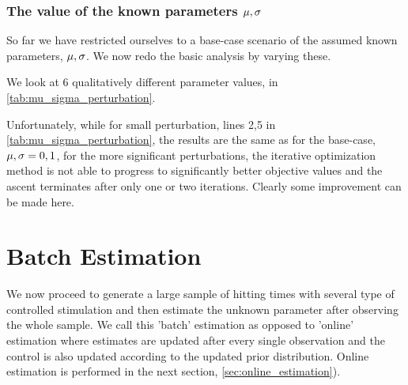 \subsubsection{The value of the known parameters $\mu, \sigma$}
So far we have restricted ourselves to a base-case scenario of the assumed known
parameters, $\mu, \sigma$. We now redo the basic analysis by varying these.

We look at 6 qualitatively different parameter values, in
\cref{tab:mu_sigma_perturbation}.

Unfortunately, while for small perturbation, lines 2,5 in
\cref{tab:mu_sigma_perturbation}, the results are the same as for the base-case,
${\mu },\sigma = 0,1$, for the more significant perturbations, the iterative
 optimization method is not able to progress to significantly better objective
 values and the ascent terminates after only one or two iterations. Clearly some 
improvement can be made here.

\clearpage

\section{Batch Estimation}
\label{sec:batch_estimation}
We now proceed to generate a large sample of hitting times with several type
of controlled stimulation and then estimate the unknown
parameter after observing the whole sample. We call this 'batch' estimation as opposed to
'online' estimation where estimates are updated after every single observation
and the control is also updated according to the updated prior distribution.
Online estimation is performed in the next
section, \cref{sec:online_estimation}).

